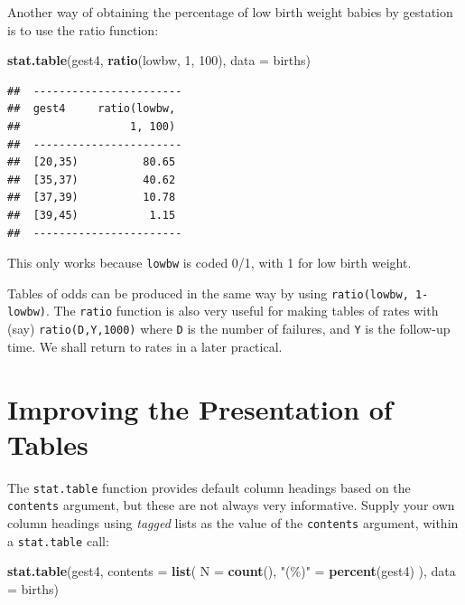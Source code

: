 \documentclass[
]{book}
\newenvironment{Shaded}{\begin{snugshade}}{\end{snugshade}}
\newcommand{\AttributeTok}[1]{\textcolor[rgb]{0.13,0.29,0.53}{#1}}
\newcommand{\DecValTok}[1]{\textcolor[rgb]{0.00,0.00,0.81}{#1}}
\newcommand{\FunctionTok}[1]{\textcolor[rgb]{0.13,0.29,0.53}{\textbf{#1}}}
\newcommand{\NormalTok}[1]{#1}
\newcommand{\OtherTok}[1]{\textcolor[rgb]{0.56,0.35,0.01}{#1}}
\newcommand{\StringTok}[1]{\textcolor[rgb]{0.31,0.60,0.02}{#1}}
\theoremstyle{definition}
\theoremstyle{definition}
\theoremstyle{definition}
\theoremstyle{definition}
\theoremstyle{remark}
\begin{document}
Another way of obtaining the percentage of low birth weight babies by
gestation is to use the ratio function:

\begin{Shaded}
\begin{Highlighting}[]
\FunctionTok{stat.table}\NormalTok{(gest4, }\FunctionTok{ratio}\NormalTok{(lowbw, }\DecValTok{1}\NormalTok{, }\DecValTok{100}\NormalTok{), }\AttributeTok{data =}\NormalTok{ births)}
\end{Highlighting}
\end{Shaded}

\begin{verbatim}
##  ----------------------- 
##  gest4     ratio(lowbw,  
##                 1, 100)  
##  ----------------------- 
##  [20,35)          80.65  
##  [35,37)          40.62  
##  [37,39)          10.78  
##  [39,45)           1.15  
##  -----------------------
\end{verbatim}

This only works because \texttt{lowbw} is coded 0/1, with 1 for low birth
weight.

Tables of odds can be produced in the same way by using
\texttt{ratio(lowbw,\ 1-lowbw)}. The \texttt{ratio} function is also very useful
for making tables of rates with (say) \texttt{ratio(D,Y,1000)} where
\texttt{D} is the number of failures, and \texttt{Y} is the follow-up time. We
shall return to rates in a later practical.

\section{Improving the Presentation of Tables}\label{improving-the-presentation-of-tables}

The \texttt{stat.table} function provides default column headings based
on the \texttt{contents} argument, but these are not always very informative.
Supply your own column headings using \emph{tagged} lists as the
value of the \texttt{contents} argument, within a \texttt{stat.table} call:

\begin{Shaded}
\begin{Highlighting}[]
\FunctionTok{stat.table}\NormalTok{(gest4, }\AttributeTok{contents =} \FunctionTok{list}\NormalTok{(}
  \AttributeTok{N =} \FunctionTok{count}\NormalTok{(),}
  \StringTok{"(\%)"} \OtherTok{=} \FunctionTok{percent}\NormalTok{(gest4)}
\NormalTok{), }\AttributeTok{data =}\NormalTok{ births)}
\end{Highlighting}
\end{Shaded}
\end{document}
